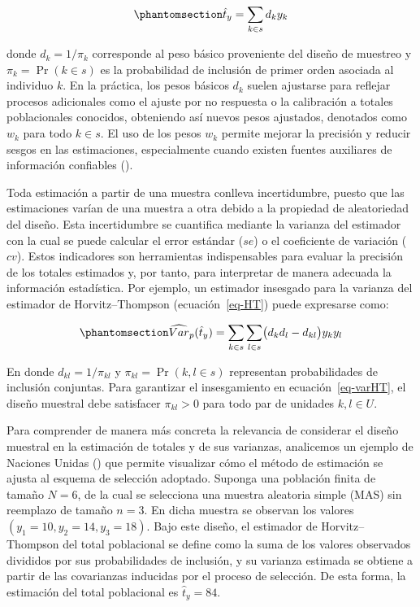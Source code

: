 \documentclass[
  spanish,
  11pt,
  letterpaper,
  oneside,
  open=any]{scrbook}
\begin{document}
\begin{equation}\protect\phantomsection\label{eq-HT}{
\hat{t}_{y} = \sum_{k \in s} d_k y_k
}\end{equation}

donde \(d_k = 1/\pi_k\) corresponde al peso básico proveniente del
diseño de muestreo y \(\pi_k = \Pr(k \in s)\) es la probabilidad de
inclusión de primer orden asociada al individuo \(k\). En la práctica,
los pesos básicos \(d_k\) suelen ajustarse para reflejar procesos
adicionales como el ajuste por no respuesta o la calibración a totales
poblacionales conocidos, obteniendo así nuevos pesos ajustados,
denotados como \(w_k\) para todo \(k \in s\). El uso de los pesos
\(w_k\) permite mejorar la precisión y reducir sesgos en las
estimaciones, especialmente cuando existen fuentes auxiliares de
información confiables ().

Toda estimación a partir de una muestra conlleva incertidumbre, puesto
que las estimaciones varían de una muestra a otra debido a la propiedad
de aleatoriedad del diseño. Esta incertidumbre se cuantifica mediante la
varianza del estimador con la cual se puede calcular el error estándar
(\(se\)) o el coeficiente de variación (\(cv\)). Estos indicadores son
herramientas indispensables para evaluar la precisión de los totales
estimados y, por tanto, para interpretar de manera adecuada la
información estadística. Por ejemplo, un estimador insesgado para la
varianza del estimador de Horvitz--Thompson (ecuación~\ref{eq-HT}) puede
expresarse como:

\begin{equation}\protect\phantomsection\label{eq-varHT}{
\widehat{Var}_p(\hat{t}_{y}) = \sum_{k \in s} \sum_{l \in s} \bigl( d_k d_l - d_{kl} \bigr) y_k y_l
}\end{equation}

En donde \(d_{kl} = 1/\pi_{kl}\) y \(\pi_{kl} = \Pr(k,l \in s)\)
representan probabilidades de inclusión conjuntas. Para garantizar el
insesgamiento en ecuación~\ref{eq-varHT}, el diseño muestral debe
satisfacer \(\pi_{kl}>0\) para todo par de unidades \(k,l\in U\).

Para comprender de manera más concreta la relevancia de considerar el
diseño muestral en la estimación de totales y de sus varianzas,
analicemos un ejemplo de Naciones Unidas
() que permite visualizar cómo el método
de estimación se ajusta al esquema de selección adoptado. Suponga una
población finita de tamaño \(N=6\), de la cual se selecciona una muestra
aleatoria simple (MAS) sin reemplazo de tamaño \(n=3\). En dicha muestra
se observan los valores \((y_1=10, y_2=14, y_3=18)\). Bajo este diseño,
el estimador de Horvitz--Thompson del total poblacional se define como
la suma de los valores observados divididos por sus probabilidades de
inclusión, y su varianza estimada se obtiene a partir de las covarianzas
inducidas por el proceso de selección. De esta forma, la estimación del
total poblacional es \(\hat{t}_{y}= 84\).
\end{document}
